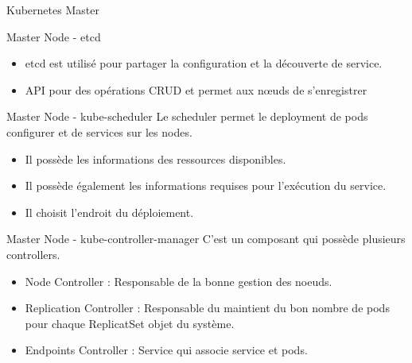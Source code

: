 \documentclass{bredelebeamer}
\begin{document}
\begin{frame}{Kubernetes Master}

\begin{block}{Master Node - etcd}
\begin{itemize}
\item etcd est utilisé pour partager la configuration et la découverte de service.
\item API pour des opérations CRUD et permet aux nœuds de s'enregistrer %
\end{itemize}
\end{block} \pause

\begin{block}{Master Node - kube-scheduler}
Le scheduler permet le deployment de pods configurer et de services sur les nodes.
\begin{itemize}
\item Il possède les informations des ressources disponibles.
\item Il possède également les informations requises pour l'exécution du service.
\item Il choisit l'endroit du déploiement.
\end{itemize}
\end{block} \pause


\begin{block}{Master Node - kube-controller-manager}
C'est un composant qui possède plusieurs controllers.
\begin{itemize}
\item Node Controller : Responsable de la bonne gestion des noeuds.
\item Replication Controller : Responsable du maintient du bon nombre de pods pour chaque ReplicatSet objet du système.
\item Endpoints Controller : Service qui associe service et pods.
\end{itemize}
\end{block}


\end{frame}
\end{document}
